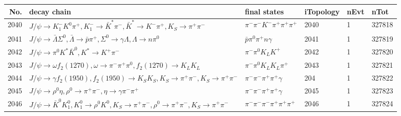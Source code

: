 \begin{table}[htbp] 
\begin{center}
\begin{small}
\begin{tabular}{rlllll}\hline\hline
 No. & decay chain & final states &  iTopology & nEvt & nTot \\\hline
2040&$J/\psi       \rightarrow K_{1}^{-}      K^{0}          \pi^{+}        , K_{1}^{-}       \rightarrow \bar{K}^{*}   \pi^{-}        , \bar{K}^{*}    \rightarrow K^{-}          \pi^{+}        , K_{S}           \rightarrow \pi^{+}        \pi^{-}        $&$\pi^{-}        \pi^{-}        K^{-}          \pi^{+}        \pi^{+}        \pi^{+}        $& 2040&    1&327818\\
2041&$J/\psi       \rightarrow \bar{\Lambda}    \Sigma^0          , \bar{\Lambda}     \rightarrow \bar{p}          \pi^{+}        , \Sigma^0           \rightarrow \gamma       \Lambda           , \Lambda            \rightarrow n                 \pi^{0}        $&$\bar{p}          \pi^{0}        \pi^{+}        n                 \gamma       $& 2041&    1&327819\\
2042&$J/\psi       \rightarrow \pi^{0}        K^{*}          \bar{K}^{0}   , K^{*}           \rightarrow K^{+}          \pi^{-}        $&$\pi^{-}        \pi^{0}        K_{L}          K^{+}          $& 2042&    1&327820\\
2043&$J/\psi       \rightarrow \omega         f_{2}(1270)    , \omega          \rightarrow \pi^{-}        \pi^{+}        \pi^{0}        , f_{2}(1270)     \rightarrow K_{L}          K_{L}          $&$\pi^{-}        \pi^{0}        K_{L}          K_{L}          \pi^{+}        $& 2043&    1&327821\\
2044&$J/\psi       \rightarrow \gamma       f_{2}(1950)    , f_{2}(1950)     \rightarrow K_{S}          K_{S}          , K_{S}           \rightarrow \pi^{+}        \pi^{-}        , K_{S}           \rightarrow \pi^{+}        \pi^{-}        $&$\pi^{-}        \pi^{-}        \pi^{+}        \pi^{+}        \gamma       $&  204&    1&327822\\
2045&$J/\psi       \rightarrow \rho^{0}      \eta          , \rho^{0}       \rightarrow \pi^{+}        \pi^{-}        , \eta           \rightarrow \gamma       \pi^{-}        \pi^{+}        $&$\pi^{-}        \pi^{-}        \pi^{+}        \pi^{+}        \gamma       $& 2045&    1&327823\\
2046&$J/\psi       \rightarrow \bar{K}^{0}   K_1^{0}        , K_1^{0}         \rightarrow \rho^{0}      K^{0}          , K_{S}           \rightarrow \pi^{+}        \pi^{-}        , \rho^{0}       \rightarrow \pi^{+}        \pi^{-}        , K_{S}           \rightarrow \pi^{+}        \pi^{-}        $&$\pi^{-}        \pi^{-}        \pi^{-}        \pi^{+}        \pi^{+}        \pi^{+}        $& 2046&    1&327824\\

\end{tabular}
\end{small}
\end{center}
\end{table}
